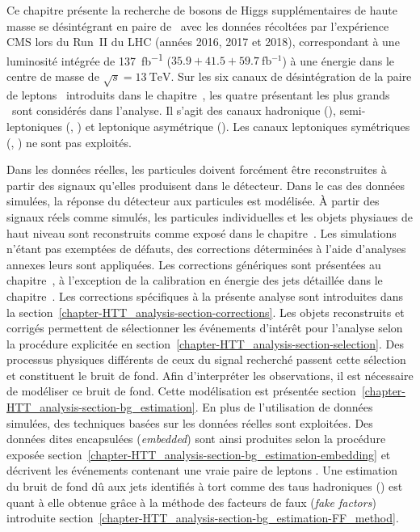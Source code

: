 Ce chapitre présente la
recherche de bosons de Higgs supplémentaires de haute masse se désintégrant en paire de \tau\
avec les données récoltées par l'expérience CMS
lors du Run~II du LHC (années 2016, 2017 et 2018),
correspondant à une luminosité intégrée de \SI{137}{\femto\barn^{-1}} ($\num{35.9}+\num{41.5}+\SI{59.7}{\femto\barn^{-1}}$)
à une énergie dans le centre de masse de $\sqrt{s}=\SI{13}{\TeV}$.
Sur les six canaux de désintégration de la paire de leptons \tau\ introduits dans le chapitre~,
les quatre présentant les plus grands \BR\ sont considérés dans l'analyse.
Il s'agit des canaux
hadronique (\tauh\tauh),
semi-leptoniques (\mu\tauh, \ele\tauh)
et
leptonique asymétrique (\ele\mu).
Les canaux leptoniques symétriques (\mu\mu, \ele\ele) ne sont pas exploités.
\par
Dans les données réelles, les particules doivent forcément être reconstruites à partir des signaux qu'elles produisent dans le détecteur.
Dans le cas des données simulées, la réponse du détecteur aux particules est modélisée.
À partir des signaux réels comme simulés, les particules individuelles et les objets physiaues de haut niveau sont reconstruits comme exposé dans le chapitre~.
Les simulations n'étant pas exemptées de défauts, des corrections déterminées à l'aide d'analyses annexes leurs sont appliquées.
Les corrections génériques sont présentées au chapitre~\refChLHCCMS,
à l'exception de la calibration en énergie des jets détaillée dans le chapitre~.
Les corrections spécifiques à la présente analyse sont introduites dans la section~\ref{chapter-HTT_analysis-section-corrections}.
Les objets reconstruits et corrigés permettent de sélectionner les événements d'intérêt pour l'analyse selon la procédure explicitée en section~\ref{chapter-HTT_analysis-section-selection}.
Des processus physiques différents de ceux du signal recherché passent cette sélection et constituent le bruit de fond.
Afin d'interpréter les observations, il est nécessaire de modéliser ce bruit de fond.
Cette modélisation est présentée section~\ref{chapter-HTT_analysis-section-bg_estimation}.
En plus de l'utilisation de données simulées, des techniques basées sur les données réelles sont exploitées.
Des données dites \og encapsulées \fg{} (\emph{embedded}) sont ainsi produites selon la procédure exposée section~\ref{chapter-HTT_analysis-section-bg_estimation-embedding} et décrivent les événements contenant une vraie paire de leptons \tau.
Une estimation du bruit de fond dû aux jets identifiés à tort comme des taus hadroniques (\ftauhs) est quant à elle obtenue grâce à la méthode des facteurs de faux (\emph{fake factors}) introduite section~\ref{chapter-HTT_analysis-section-bg_estimation-FF_method}.
